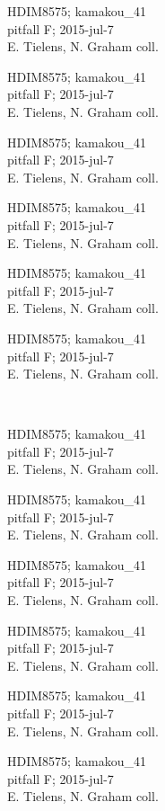 \documentclass[2pt]{extarticle}
\begin{document}
\noindent
\parbox{0.16\textwidth}{\tiny \raggedright \rule[-0.3\baselineskip]{0pt}{10pt}HDIM8575; kamakou\_41\\ pitfall F; 2015-jul-7\\ E. Tielens, N. Graham coll.}
\parbox{0.16\textwidth}{\tiny \raggedright \rule[-0.3\baselineskip]{0pt}{10pt}HDIM8575; kamakou\_41\\ pitfall F; 2015-jul-7\\ E. Tielens, N. Graham coll.}
\parbox{0.16\textwidth}{\tiny \raggedright \rule[-0.3\baselineskip]{0pt}{10pt}HDIM8575; kamakou\_41\\ pitfall F; 2015-jul-7\\ E. Tielens, N. Graham coll.}
\parbox{0.16\textwidth}{\tiny \raggedright \rule[-0.3\baselineskip]{0pt}{10pt}HDIM8575; kamakou\_41\\ pitfall F; 2015-jul-7\\ E. Tielens, N. Graham coll.}
\parbox{0.16\textwidth}{\tiny \raggedright \rule[-0.3\baselineskip]{0pt}{10pt}HDIM8575; kamakou\_41\\ pitfall F; 2015-jul-7\\ E. Tielens, N. Graham coll.}
\parbox{0.16\textwidth}{\tiny \raggedright \rule[-0.3\baselineskip]{0pt}{10pt}HDIM8575; kamakou\_41\\ pitfall F; 2015-jul-7\\ E. Tielens, N. Graham coll.} \\ 
\vspace{0.001in} 

\noindent
\parbox{0.16\textwidth}{\tiny \raggedright \rule[-0.3\baselineskip]{0pt}{10pt}HDIM8575; kamakou\_41\\ pitfall F; 2015-jul-7\\ E. Tielens, N. Graham coll.}
\parbox{0.16\textwidth}{\tiny \raggedright \rule[-0.3\baselineskip]{0pt}{10pt}HDIM8575; kamakou\_41\\ pitfall F; 2015-jul-7\\ E. Tielens, N. Graham coll.}
\parbox{0.16\textwidth}{\tiny \raggedright \rule[-0.3\baselineskip]{0pt}{10pt}HDIM8575; kamakou\_41\\ pitfall F; 2015-jul-7\\ E. Tielens, N. Graham coll.}
\parbox{0.16\textwidth}{\tiny \raggedright \rule[-0.3\baselineskip]{0pt}{10pt}HDIM8575; kamakou\_41\\ pitfall F; 2015-jul-7\\ E. Tielens, N. Graham coll.}
\parbox{0.16\textwidth}{\tiny \raggedright \rule[-0.3\baselineskip]{0pt}{10pt}HDIM8575; kamakou\_41\\ pitfall F; 2015-jul-7\\ E. Tielens, N. Graham coll.}
\parbox{0.16\textwidth}{\tiny \raggedright \rule[-0.3\baselineskip]{0pt}{10pt}HDIM8575; kamakou\_41\\ pitfall F; 2015-jul-7\\ E. Tielens, N. Graham coll.} \\ 
\vspace{0.001in} 
\end{document}
